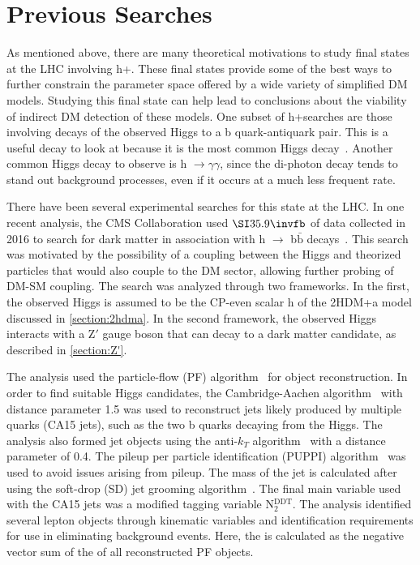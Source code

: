 \chapter{Previous Searches}
As mentioned above, there are many theoretical motivations to study final states at the LHC involving h+\ptmiss. These final states provide some of the best ways to further constrain the parameter space offered by a wide variety of simplified DM models. Studying this final state can help lead to conclusions about the viability of indirect DM detection of these models. One subset of h+\ptmiss searches are those involving decays of the observed Higgs to a b quark-antiquark pair. This is a useful decay to look at because it is the most common Higgs decay~\cite{Zyla:2020zbs}. Another common Higgs decay to observe is h $\to\gamma\gamma$, since the di-photon decay tends to stand out background processes, even if it occurs at a much less frequent rate.

There have been several experimental searches for this state at the LHC. In one recent analysis, the CMS Collaboration used $\fbinv{35.9}$ of data collected in 2016 to search for dark matter in association with h $\to$ b$\bar{\mathrm{b}}$ decays~\cite{cms:hbb2019}. This search was motivated by the possibility of a coupling between the Higgs and theorized particles that would also couple to the DM sector, allowing further probing of DM-SM coupling. The search was analyzed through two frameworks. In the first, the observed Higgs is assumed to be the CP-even scalar h of the 2HDM+a model discussed in \cref{section:2hdma}. In the second framework, the observed Higgs interacts with a Z$'$ gauge boson that can decay to a dark matter candidate, as described in \cref{section:Z'}.

The analysis used the particle-flow (PF) algorithm~\cite{cms:pf2017} for object reconstruction. In order to find suitable Higgs candidates, the Cambridge-Aachen algorithm~\cite{cms:2009lxa} with distance parameter 1.5 was used to reconstruct jets likely produced by multiple quarks (CA15 jets), such as the two b quarks decaying from the Higgs. The analysis also formed jet objects using the anti-$k_{T}$ algorithm~\cite{ak2008} with a distance parameter of 0.4. The pileup per particle identification (PUPPI) algorithm~\cite{puppi2014} was used to avoid issues arising from pileup. The mass of the jet is calculated after using the soft-drop (SD) jet grooming algorithm~\cite{sd2014}. The final main variable used with the CA15 jets was a modified tagging variable N$_2^\text{DDT}$. The analysis identified several lepton objects through kinematic variables and identification requirements for use in eliminating background events. Here, the \ptvecmiss is calculated as the negative vector sum of the \pt of all reconstructed PF objects.

